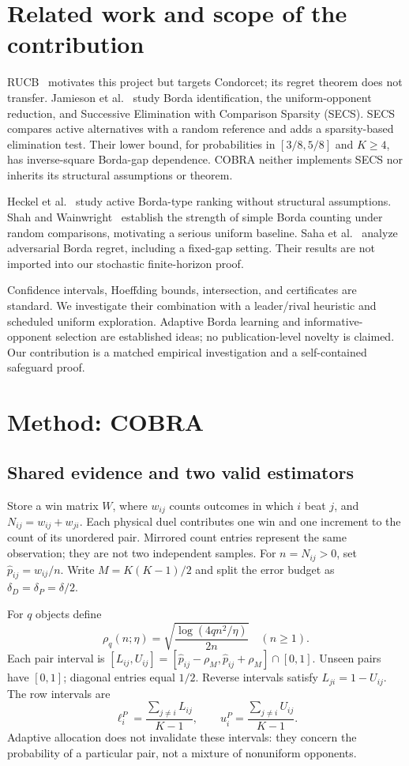 \documentclass[11pt,a4paper]{article}
\begin{document}
\section{Related work and scope of the contribution}
RUCB~\cite{zoghi} motivates this project but targets Condorcet; its regret theorem does not transfer. Jamieson et al.~\cite{jamieson} study Borda identification, the uniform-opponent reduction, and Successive Elimination with Comparison Sparsity (SECS). SECS compares active alternatives with a random reference and adds a sparsity-based elimination test. Their lower bound, for probabilities in $[3/8,5/8]$ and $K\ge4$, has inverse-square Borda-gap dependence. COBRA neither implements SECS nor inherits its structural assumptions or theorem.

Heckel et al.~\cite{heckel} study active Borda-type ranking without structural assumptions. Shah and Wainwright~\cite{shah} establish the strength of simple Borda counting under random comparisons, motivating a serious uniform baseline. Saha et al.~\cite{saha} analyze adversarial Borda regret, including a fixed-gap setting. Their results are not imported into our stochastic finite-horizon proof.

Confidence intervals, Hoeffding bounds, intersection, and certificates are standard. We investigate their combination with a leader/rival heuristic and scheduled uniform exploration. Adaptive Borda learning and informative-opponent selection are established ideas; no publication-level novelty is claimed. Our contribution is a matched empirical investigation and a self-contained safeguard proof.

\section{Method: COBRA}
\subsection{Shared evidence and two valid estimators}
Store a win matrix $W$, where $w_{ij}$ counts outcomes in which $i$ beat $j$, and $N_{ij}=w_{ij}+w_{ji}$. Each physical duel contributes one win and one increment to the count of its unordered pair. Mirrored count entries represent the same observation; they are not two independent samples. For $n=N_{ij}>0$, set $\hat p_{ij}=w_{ij}/n$. Write $M=K(K-1)/2$ and split the error budget as $\delta_D=\delta_P=\delta/2$.

For $q$ objects define
\begin{equation}\label{eq:radius}
\rho_q(n;\eta)=\sqrt{\frac{\log(4qn^2/\eta)}{2n}}\quad(n\ge1).
\end{equation}
Each pair interval is $[L_{ij},U_{ij}]=[\hat p_{ij}-\rho_M,\hat p_{ij}+\rho_M]\cap[0,1]$. Unseen pairs have $[0,1]$; diagonal entries equal $1/2$. Reverse intervals satisfy $L_{ji}=1-U_{ij}$. The row intervals are
\begin{equation}\label{eq:rows}
\ell_i^P=\frac{\sum_{j\ne i}L_{ij}}{K-1},\qquad
u_i^P=\frac{\sum_{j\ne i}U_{ij}}{K-1}.
\end{equation}
Adaptive allocation does not invalidate these intervals: they concern the probability of a particular pair, not a mixture of nonuniform opponents.
\end{document}
